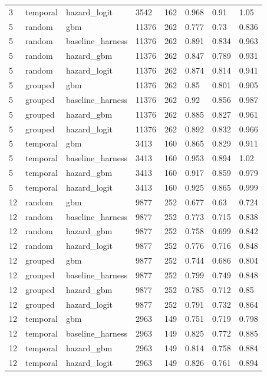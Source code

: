 \begin{tabular}{llllllll}
3 & temporal & hazard\_logit & 3542 & 162 & 0.968 & 0.91 & 1.05 \\
5 & random & gbm & 11376 & 262 & 0.777 & 0.73 & 0.836 \\
5 & random & baseline\_harness & 11376 & 262 & 0.891 & 0.834 & 0.963 \\
5 & random & hazard\_gbm & 11376 & 262 & 0.847 & 0.789 & 0.931 \\
5 & random & hazard\_logit & 11376 & 262 & 0.874 & 0.814 & 0.941 \\
5 & grouped & gbm & 11376 & 262 & 0.85 & 0.801 & 0.905 \\
5 & grouped & baseline\_harness & 11376 & 262 & 0.92 & 0.856 & 0.987 \\
5 & grouped & hazard\_gbm & 11376 & 262 & 0.885 & 0.827 & 0.961 \\
5 & grouped & hazard\_logit & 11376 & 262 & 0.892 & 0.832 & 0.966 \\
5 & temporal & gbm & 3413 & 160 & 0.865 & 0.829 & 0.911 \\
5 & temporal & baseline\_harness & 3413 & 160 & 0.953 & 0.894 & 1.02 \\
5 & temporal & hazard\_gbm & 3413 & 160 & 0.917 & 0.859 & 0.979 \\
5 & temporal & hazard\_logit & 3413 & 160 & 0.925 & 0.865 & 0.999 \\
12 & random & gbm & 9877 & 252 & 0.677 & 0.63 & 0.724 \\
12 & random & baseline\_harness & 9877 & 252 & 0.773 & 0.715 & 0.838 \\
12 & random & hazard\_gbm & 9877 & 252 & 0.758 & 0.699 & 0.842 \\
12 & random & hazard\_logit & 9877 & 252 & 0.776 & 0.716 & 0.848 \\
12 & grouped & gbm & 9877 & 252 & 0.744 & 0.686 & 0.804 \\
12 & grouped & baseline\_harness & 9877 & 252 & 0.799 & 0.749 & 0.848 \\
12 & grouped & hazard\_gbm & 9877 & 252 & 0.785 & 0.712 & 0.85 \\
12 & grouped & hazard\_logit & 9877 & 252 & 0.791 & 0.732 & 0.864 \\
12 & temporal & gbm & 2963 & 149 & 0.751 & 0.719 & 0.798 \\
12 & temporal & baseline\_harness & 2963 & 149 & 0.825 & 0.772 & 0.885 \\
12 & temporal & hazard\_gbm & 2963 & 149 & 0.814 & 0.758 & 0.884 \\
12 & temporal & hazard\_logit & 2963 & 149 & 0.826 & 0.761 & 0.894 \\
\bottomrule
\end{tabular}